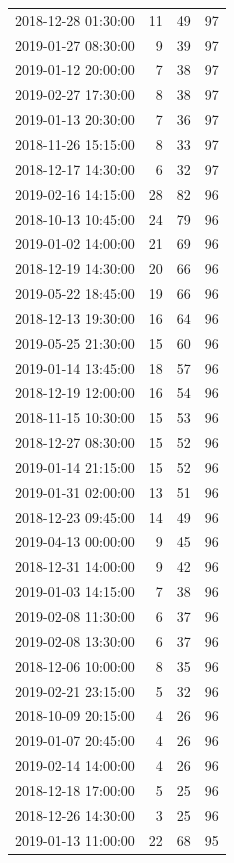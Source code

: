 \begin{tabular}{lrrr}
2018-12-28 01:30:00 & 11 & 49 & 97 \\
2019-01-27 08:30:00 & 9 & 39 & 97 \\
2019-01-12 20:00:00 & 7 & 38 & 97 \\
2019-02-27 17:30:00 & 8 & 38 & 97 \\
2019-01-13 20:30:00 & 7 & 36 & 97 \\
2018-11-26 15:15:00 & 8 & 33 & 97 \\
2018-12-17 14:30:00 & 6 & 32 & 97 \\
2019-02-16 14:15:00 & 28 & 82 & 96 \\
2018-10-13 10:45:00 & 24 & 79 & 96 \\
2019-01-02 14:00:00 & 21 & 69 & 96 \\
2018-12-19 14:30:00 & 20 & 66 & 96 \\
2019-05-22 18:45:00 & 19 & 66 & 96 \\
2018-12-13 19:30:00 & 16 & 64 & 96 \\
2019-05-25 21:30:00 & 15 & 60 & 96 \\
2019-01-14 13:45:00 & 18 & 57 & 96 \\
2018-12-19 12:00:00 & 16 & 54 & 96 \\
2018-11-15 10:30:00 & 15 & 53 & 96 \\
2018-12-27 08:30:00 & 15 & 52 & 96 \\
2019-01-14 21:15:00 & 15 & 52 & 96 \\
2019-01-31 02:00:00 & 13 & 51 & 96 \\
2018-12-23 09:45:00 & 14 & 49 & 96 \\
2019-04-13 00:00:00 & 9 & 45 & 96 \\
2018-12-31 14:00:00 & 9 & 42 & 96 \\
2019-01-03 14:15:00 & 7 & 38 & 96 \\
2019-02-08 11:30:00 & 6 & 37 & 96 \\
2019-02-08 13:30:00 & 6 & 37 & 96 \\
2018-12-06 10:00:00 & 8 & 35 & 96 \\
2019-02-21 23:15:00 & 5 & 32 & 96 \\
2018-10-09 20:15:00 & 4 & 26 & 96 \\
2019-01-07 20:45:00 & 4 & 26 & 96 \\
2019-02-14 14:00:00 & 4 & 26 & 96 \\
2018-12-18 17:00:00 & 5 & 25 & 96 \\
2018-12-26 14:30:00 & 3 & 25 & 96 \\
2019-01-13 11:00:00 & 22 & 68 & 95 \\

\end{tabular}
